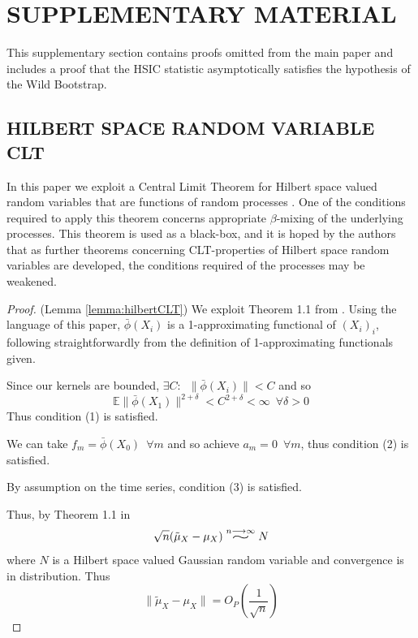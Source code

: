 \documentclass[]{article}
\newcommand{\widesim}[2][1.5]{
  \mathrel{\overset{#2}{\scalebox{#1}[1]{$\sim$}}}}
\begin{document}
\section{SUPPLEMENTARY MATERIAL}
This supplementary section contains proofs omitted from the main paper and includes a proof that the HSIC statistic asymptotically satisfies the hypothesis of the Wild Bootstrap.







\subsection{HILBERT SPACE RANDOM VARIABLE CLT}\label{supp:hilbert-clt}

In this paper we exploit a Central Limit Theorem for Hilbert space valued random variables that are functions of random processes \citep{dehling2015bootstrap}. One of the conditions required to apply this theorem concerns appropriate $\beta$-mixing of the underlying processes. This theorem is used as a black-box, and it is hoped by the authors that as further theorems concerning CLT-properties of Hilbert space random variables are developed, the conditions required of the processes may be weakened.
\begin{proof}(Lemma \ref{lemma:hilbertCLT})
We exploit Theorem 1.1 from \citet{dehling2015bootstrap}. Using the language of this paper, $\bar{\phi}(X_i)$ is a 1-approximating functional of $(X_i)_i$, following straightforwardly from the definition of 1-approximating functionals given. 

Since our kernels are bounded, $\exists C: \enspace \|\bar{\phi}(X_i)\| < C $ and so \[\mathbb{E}\|\bar{\phi}(X_1)\|^{2+\delta} <C^{2+\delta}< \infty \enspace \forall \delta>0\]
Thus condition (1) is satisfied.

We can take $f_m = \bar{\phi}(X_0)\enspace \forall m$ and so achieve $a_m= 0 \enspace \forall m$, thus condition (2) is satisfied.

By assumption on the time series, condition (3) is satisfied.

Thus, by Theorem 1.1 in \citet{dehling2015bootstrap}
\[\sqrt{n} (\tilde{\mu}_{X} - \mu_{X}) \widesim[2]{n\longrightarrow\infty} N\]
where $N$ is a Hilbert space valued Gaussian random variable and convergence is in distribution. Thus 
\[\|\tilde{\mu}_{X} - \mu_{X}\| = O_P(\frac{1}{\sqrt{n}})\]
\end{proof}
\end{document}

